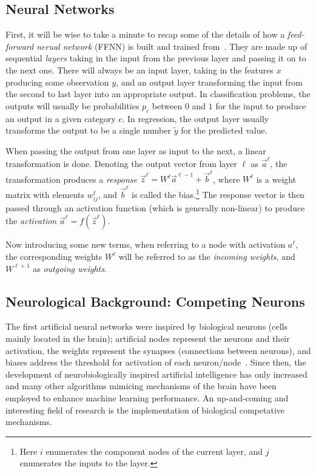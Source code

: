      

\subsection{Neural Networks}
    First, it will be wise to take a minute to recap some of the details of how a \textit{feed-forward nerual network} (FFNN) is built and trained from~\cite{Project2}. They are made up of sequential \textit{layers} taking in the input from the previous layer and passing it on to the next one. There will always be an input layer, taking in the features $x$ producing some observation $y$, and an output layer transforming the input from the second to last layer into an appropriate output. In classification problems, the outputs will usually be probabilities $p_c$ between $0$ and $1$ for the input to produce an output in a given category $c$. In regression, the output layer usually transforms the output to be a single number $\tilde{y}$ for the predicted value.

    When passing the output from one layer as input to the next, a linear transformation is done. Denoting the output vector from layer $\ell$ as $\vec{a}^\ell$, the transformation produces a \textit{response} $\vec{z}^{\ell} = W^\ell \vec{a}^{\ell-1} + \vec{b}^\ell$, where $W^\ell$ is a weight matrix with elements $w^\ell_{ij}$, and $\vec{b}^\ell$ is called the bias.\footnote{Here $i$ enumerates the component nodes of the current layer, and $j$ enumerates the inputs to the layer.} The response vector is then passed through an activation function (which is generally non-linear) to produce the \textit{activation} $\vec{a}^\ell = f(\vec{z}^\ell)$.

    Now introducing some new terms, when referring to a node with activation $a^\ell$, the corresponding weights $W^\ell$ will be referred to as the \textit{incoming weights}, and $W^{\ell + 1}$ as \textit{outgoing weights}.

\subsection{Neurological Background: Competing Neurons}
    The first artificial neural networks were inspired by biological neurons (cells mainly located in the brain); artificial nodes represent the neurons and their activation, the weights represent the synapses (connections between neurons), and biases address the threshold for activation of each neuron/node~\citep{Project2}. Since then, the development of neurobiologically inspired artificial intelligence has only increased and many other algorithms mimicing mechanisms of the brain have been employed to enhance machine learning performance. An up-and-coming and interesting field of research is the implementation of biological competative mechanisms. 
    
